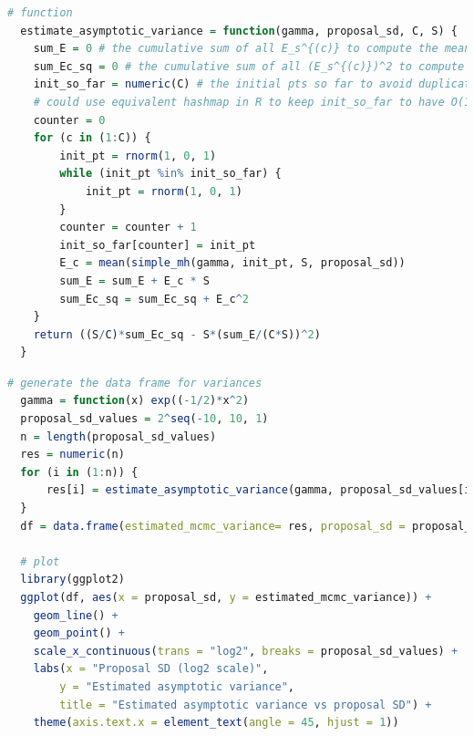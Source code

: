 \documentclass{article}
\begin{document}
\begin{lstlisting}[language=R]
  # function
  estimate_asymptotic_variance = function(gamma, proposal_sd, C, S) {
    sum_E = 0 # the cumulative sum of all E_s^{(c)} to compute the mean: E
    sum_Ec_sq = 0 # the cumulative sum of all (E_s^{(c)})^2 to compute the 2nd moment
    init_so_far = numeric(C) # the initial pts so far to avoid duplicate initial pt
    # could use equivalent hashmap in R to keep init_so_far to have O(1) find()
    counter = 0
    for (c in (1:C)) {    
        init_pt = rnorm(1, 0, 1)
        while (init_pt %in% init_so_far) {
            init_pt = rnorm(1, 0, 1)
        }
        counter = counter + 1
        init_so_far[counter] = init_pt
        E_c = mean(simple_mh(gamma, init_pt, S, proposal_sd))
        sum_E = sum_E + E_c * S
        sum_Ec_sq = sum_Ec_sq + E_c^2
    }
    return ((S/C)*sum_Ec_sq - S*(sum_E/(C*S))^2)
  }
\end{lstlisting}


\begin{lstlisting}[language=R]
  # generate the data frame for variances
  gamma = function(x) exp((-1/2)*x^2)
  proposal_sd_values = 2^seq(-10, 10, 1)
  n = length(proposal_sd_values)
  res = numeric(n)
  for (i in (1:n)) {
      res[i] = estimate_asymptotic_variance(gamma, proposal_sd_values[i], 100, 1000)
  }
  df = data.frame(estimated_mcmc_variance= res, proposal_sd = proposal_sd_values)

  # plot
  library(ggplot2)
  ggplot(df, aes(x = proposal_sd, y = estimated_mcmc_variance)) +
    geom_line() +
    geom_point() +
    scale_x_continuous(trans = "log2", breaks = proposal_sd_values) +
    labs(x = "Proposal SD (log2 scale)",
        y = "Estimated asymptotic variance",
        title = "Estimated asymptotic variance vs proposal SD") + 
    theme(axis.text.x = element_text(angle = 45, hjust = 1))
\end{lstlisting}
\end{document}
